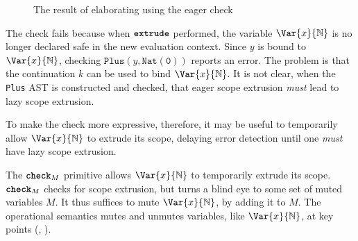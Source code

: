 \begin{figure}[H]
\begin{center}

\end{center}
\caption{The result of elaborating  using the eager check}
\label{fig:core-eager-looks-unsafe}
\end{figure}

The check fails because when $\textbf{\texttt{extrude}}$ performed, the variable $\Var{x}{\mathbb{N}}$ is no longer declared safe in the new evaluation context. Since $y$ is bound to $\Var{x} {\mathbb{N}}$, checking $\texttt{Plus}(y, \texttt{Nat}(\texttt{0}))$ reports an error. The problem is that the continuation $k$ can be used to bind $\Var{x}{\mathbb{N}}$. It is not clear, when the \texttt{Plus} AST is constructed and checked, that eager scope extrusion \textit{must} lead to lazy scope extrusion. 

To make the check more expressive, therefore, it may be useful to temporarily allow $\Var{x}{\mathbb{N}}$ to extrude its scope, delaying error detection until one \textit{must} have lazy scope extrusion. 

The $\textbf{\texttt{check}}_M$ primitive allows $\Var{x}{\mathbb{N}}$ to temporarily extrude its scope. $\textbf{\texttt{check}}_M$ checks for scope extrusion, but turns a blind eye to some set of muted variables $M$. It thus suffices to mute $\Var{x}{\mathbb{N}}$, by adding it to $M$. The \coreLang{} operational semantics mutes and unmutes variables, like $\Var{x}{\mathbb{N}}$, at key points (, ). 

